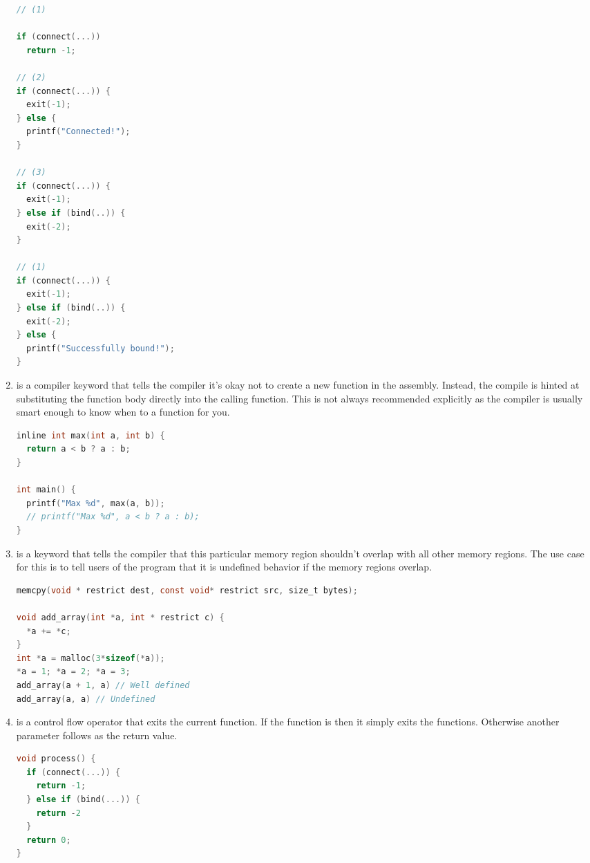 \begin{enumerate}
	      \begin{lstlisting}[language=C]
// (1)

if (connect(...))
  return -1;

// (2)
if (connect(...)) {
  exit(-1);
} else {
  printf("Connected!");
}

// (3)
if (connect(...)) {
  exit(-1);
} else if (bind(..)) {
  exit(-2);
}

// (1)
if (connect(...)) {
  exit(-1);
} else if (bind(..)) {
  exit(-2);
} else {
  printf("Successfully bound!");
}
\end{lstlisting}

	\item {} is a compiler keyword that tells the compiler it's okay not to create a new function in the assembly. Instead, the compile is hinted at substituting the function body directly into the calling function. This is not always recommended explicitly as the compiler is usually smart enough to know when to  a function for you.

	      \begin{lstlisting}[language=C]
inline int max(int a, int b) {
  return a < b ? a : b;
}

int main() {
  printf("Max %d", max(a, b));
  // printf("Max %d", a < b ? a : b);
}
\end{lstlisting}

	\item {} is a keyword that tells the compiler that this particular memory region shouldn't overlap with all other memory regions. The use case for this is to tell users of the program that it is undefined behavior if the memory regions overlap.

	      \begin{lstlisting}[language=C]
memcpy(void * restrict dest, const void* restrict src, size_t bytes);

void add_array(int *a, int * restrict c) {
  *a += *c;
}
int *a = malloc(3*sizeof(*a));
*a = 1; *a = 2; *a = 3;
add_array(a + 1, a) // Well defined
add_array(a, a) // Undefined
\end{lstlisting}
	\item {} is a control flow operator that exits the current function. If the function is  then it simply exits the functions. Otherwise another parameter follows as the return value.

	      \begin{lstlisting}[language=C]
void process() {
  if (connect(...)) {
    return -1;
  } else if (bind(...)) {
    return -2
  }
  return 0;
}
\end{lstlisting}


\end{enumerate}
